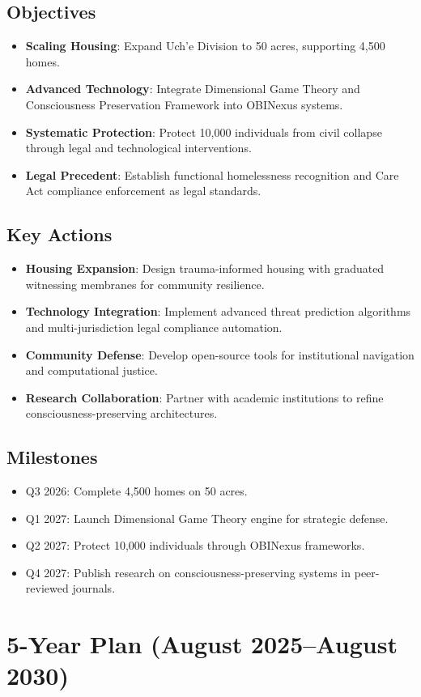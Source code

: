 \documentclass[12pt]{article}\usepackage[a4paper,margin=1in]{geometry}
\begin{document}
\subsection*{Objectives}
\begin{itemize}
    \item \textbf{Scaling Housing}: Expand Uch'e Division to 50 acres, supporting 4,500 homes.
    \item \textbf{Advanced Technology}: Integrate Dimensional Game Theory and Consciousness Preservation Framework into OBINexus systems.
    \item \textbf{Systematic Protection}: Protect 10,000 individuals from civil collapse through legal and technological interventions.
    \item \textbf{Legal Precedent}: Establish functional homelessness recognition and Care Act compliance enforcement as legal standards.
\end{itemize}\subsection*{Key Actions}
\begin{itemize}
    \item \textbf{Housing Expansion}: Design trauma-informed housing with graduated witnessing membranes for community resilience.
    \item \textbf{Technology Integration}: Implement advanced threat prediction algorithms and multi-jurisdiction legal compliance automation.
    \item \textbf{Community Defense}: Develop open-source tools for institutional navigation and computational justice.
    \item \textbf{Research Collaboration}: Partner with academic institutions to refine consciousness-preserving architectures.
\end{itemize}\subsection*{Milestones}
\begin{itemize}
    \item Q3 2026: Complete 4,500 homes on 50 acres.
    \item Q1 2027: Launch Dimensional Game Theory engine for strategic defense.
    \item Q2 2027: Protect 10,000 individuals through OBINexus frameworks.
    \item Q4 2027: Publish research on consciousness-preserving systems in peer-reviewed journals.
\end{itemize}\section*{5-Year Plan (August 2025--August 2030)}
\end{document}
